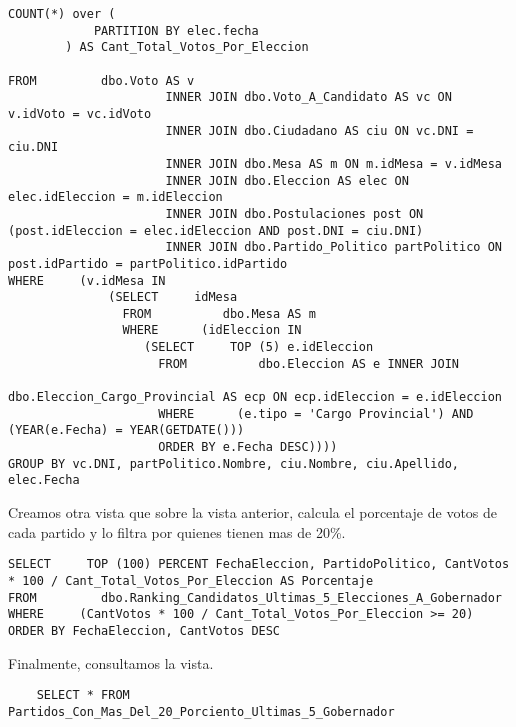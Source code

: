 \begin{enumerate}
\begin{lstlisting}
COUNT(*) over (
	        PARTITION BY elec.fecha
	    ) AS Cant_Total_Votos_Por_Eleccion  

FROM         dbo.Voto AS v 
                      INNER JOIN dbo.Voto_A_Candidato AS vc ON v.idVoto = vc.idVoto 
                      INNER JOIN dbo.Ciudadano AS ciu ON vc.DNI = ciu.DNI 
                      INNER JOIN dbo.Mesa AS m ON m.idMesa = v.idMesa 
                      INNER JOIN dbo.Eleccion AS elec ON elec.idEleccion = m.idEleccion
                      INNER JOIN dbo.Postulaciones post ON (post.idEleccion = elec.idEleccion AND post.DNI = ciu.DNI)
                      INNER JOIN dbo.Partido_Politico partPolitico ON post.idPartido = partPolitico.idPartido
WHERE     (v.idMesa IN
              (SELECT     idMesa
                FROM          dbo.Mesa AS m
                WHERE      (idEleccion IN
		           (SELECT     TOP (5) e.idEleccion
		             FROM          dbo.Eleccion AS e INNER JOIN
		                                    dbo.Eleccion_Cargo_Provincial AS ecp ON ecp.idEleccion = e.idEleccion
		             WHERE      (e.tipo = 'Cargo Provincial') AND (YEAR(e.Fecha) = YEAR(GETDATE()))
		             ORDER BY e.Fecha DESC))))
GROUP BY vc.DNI, partPolitico.Nombre, ciu.Nombre, ciu.Apellido, elec.Fecha
\end{lstlisting}

Creamos otra vista que sobre la vista anterior, calcula el porcentaje de votos de cada partido y lo filtra por quienes tienen mas de 20\%.

\begin{lstlisting}
SELECT     TOP (100) PERCENT FechaEleccion, PartidoPolitico, CantVotos * 100 / Cant_Total_Votos_Por_Eleccion AS Porcentaje
FROM         dbo.Ranking_Candidatos_Ultimas_5_Elecciones_A_Gobernador
WHERE     (CantVotos * 100 / Cant_Total_Votos_Por_Eleccion >= 20)
ORDER BY FechaEleccion, CantVotos DESC
\end{lstlisting}

Finalmente, consultamos la vista.

\begin{lstlisting}
	SELECT * FROM Partidos_Con_Mas_Del_20_Porciento_Ultimas_5_Gobernador
\end{lstlisting}

\end{enumerate}